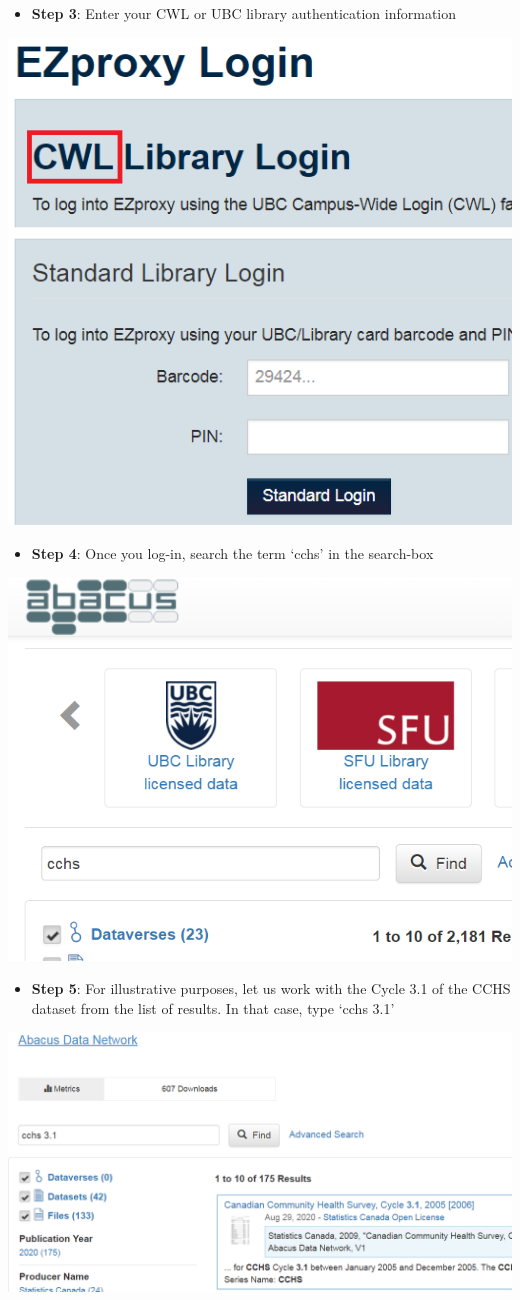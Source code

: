\documentclass[
]{book}
\providecommand{\tightlist}{%
  \setlength{\itemsep}{0pt}\setlength{\parskip}{0pt}}
\begin{document}
\begin{itemize}
\tightlist
\item
  \textbf{Step 3}: Enter your CWL or UBC library authentication information
\end{itemize}

\includegraphics[width=0.65\linewidth]{images/abacus3}

\begin{itemize}
\tightlist
\item
  \textbf{Step 4}: Once you log-in, search the term `cchs' in the search-box
\end{itemize}

\includegraphics[width=0.65\linewidth]{images/abacusX4}

\begin{itemize}
\tightlist
\item
  \textbf{Step 5}: For illustrative purposes, let us work with the Cycle 3.1 of the CCHS dataset from the list of results. In that case, type `cchs 3.1'
\end{itemize}

\includegraphics[width=0.65\linewidth]{images/abacusX5}
\end{document}
